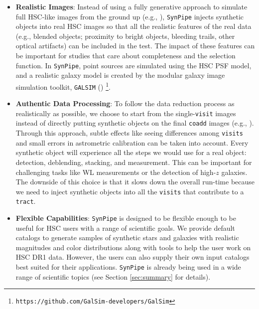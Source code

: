 \documentclass[useamsfonts]{pasj01}
\def\synpipe{\texttt{SynPipe}}
\def\coadd{\texttt{coadd}}
\def\tract{\texttt{tract}}
\def\visit{\texttt{visit}}
\def\visits{\texttt{visits}}
\def\galsim{\texttt{G}{\scriptsize \texttt{AL}}\texttt{S}{\scriptsize \texttt{IM}}}
\begin{document}
    \begin{itemize}

        \item \textbf{Realistic Images}:
            Instead of using a fully generative approach to simulate full HSC-like
            images from the ground up (e.g., \citealt{Chang2015}), \synpipe{} injects
            synthetic objects into real HSC images so that all the realistic
            features of the real data (e.g., blended objects; proximity to bright
            objects, bleeding trails, other optical artifacts) can be included in the
            test.
            The impact of these features can be important for studies that care about 
            completeness and the selection function.
            In \synpipe{}, point sources are simulated using the HSC PSF model,
            and a realistic galaxy model is created by the modular galaxy image
            simulation toolkit, \galsim{} (\citealt{Rowe2015})
            \footnote{\texttt{https://github.com/GalSim-developers/GalSim}}.

        \item \textbf{Authentic Data Processing}:
            To follow the data reduction process as realistically as possible, we 
            choose to start from the single-\visit{} images instead of directly putting 
            synthetic objects on the final \coadd{} images 
            (e.g., \citealt{Suchyta2016}).
            Through this approach, subtle effects like seeing differences among
            \visits{} and small errors in astrometric calibration can be taken
            into account.
            Every synthetic object will experience all the steps we would use for a 
            real object: detection, deblending, stacking, and measurement.
            This can be important for challenging tasks like WL measurements or the 
            detection of high-$z$ galaxies.
            The downside of this choice is that it slows down the overall run-time
            because we need to inject synthetic objects into all the \visits{} that 
            contribute to a \tract{}.
        
        \item \textbf{Flexible Capabilities}: 
            \synpipe{} is designed to be flexible enough to be useful for HSC users 
            with a range of scientific goals.
            We provide default catalogs to generate samples of synthetic stars
            and galaxies with realistic magnitudes and color distributions along with
            tools to help the user work on HSC DR1 data. 
            However, the users can also supply their own input catalogs best suited 
            for their applications.
            \synpipe{} is already being used in a wide range of
            scientific topics (see Section \ref{sec:summary} for details).
            

\end{itemize}
\end{document}
